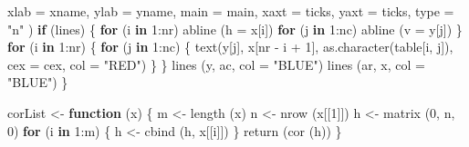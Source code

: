 \documentclass[
  12pt,
]{book}
\newenvironment{Shaded}{\begin{snugshade}}{\end{snugshade}}
\newcommand{\AttributeTok}[1]{\textcolor[rgb]{0.77,0.63,0.00}{#1}}
\newcommand{\ControlFlowTok}[1]{\textcolor[rgb]{0.13,0.29,0.53}{\textbf{#1}}}
\newcommand{\DecValTok}[1]{\textcolor[rgb]{0.00,0.00,0.81}{#1}}
\newcommand{\FunctionTok}[1]{\textcolor[rgb]{0.00,0.00,0.00}{#1}}
\newcommand{\NormalTok}[1]{#1}
\newcommand{\OtherTok}[1]{\textcolor[rgb]{0.56,0.35,0.01}{#1}}
\newcommand{\SpecialCharTok}[1]{\textcolor[rgb]{0.00,0.00,0.00}{#1}}
\newcommand{\StringTok}[1]{\textcolor[rgb]{0.31,0.60,0.02}{#1}}
\begin{document}
\begin{Shaded}
\begin{Highlighting}[]
      \AttributeTok{xlab =}\NormalTok{ xname,}
      \AttributeTok{ylab =}\NormalTok{ yname,}
      \AttributeTok{main =}\NormalTok{ main,}
      \AttributeTok{xaxt =}\NormalTok{ ticks,}
      \AttributeTok{yaxt =}\NormalTok{ ticks,}
      \AttributeTok{type =} \StringTok{"n"}
\NormalTok{    )}
    \ControlFlowTok{if}\NormalTok{ (lines) \{}
      \ControlFlowTok{for}\NormalTok{ (i }\ControlFlowTok{in} \DecValTok{1}\SpecialCharTok{:}\NormalTok{nr)}
        \FunctionTok{abline}\NormalTok{ (}\AttributeTok{h =}\NormalTok{ x[i])}
      \ControlFlowTok{for}\NormalTok{ (j }\ControlFlowTok{in} \DecValTok{1}\SpecialCharTok{:}\NormalTok{nc)}
        \FunctionTok{abline}\NormalTok{ (}\AttributeTok{v =}\NormalTok{ y[j])}
\NormalTok{    \}}
    \ControlFlowTok{for}\NormalTok{ (i }\ControlFlowTok{in} \DecValTok{1}\SpecialCharTok{:}\NormalTok{nr) \{}
      \ControlFlowTok{for}\NormalTok{ (j }\ControlFlowTok{in} \DecValTok{1}\SpecialCharTok{:}\NormalTok{nc) \{}
        \FunctionTok{text}\NormalTok{(y[j],}
\NormalTok{             x[nr }\SpecialCharTok{{-}}\NormalTok{ i }\SpecialCharTok{+} \DecValTok{1}\NormalTok{],}
             \FunctionTok{as.character}\NormalTok{(table[i, j]),}
             \AttributeTok{cex =}\NormalTok{ cex,}
             \AttributeTok{col =} \StringTok{"RED"}\NormalTok{)}
\NormalTok{      \}}
\NormalTok{    \}}
    \FunctionTok{lines}\NormalTok{ (y, ac, }\AttributeTok{col =} \StringTok{"BLUE"}\NormalTok{)}
    \FunctionTok{lines}\NormalTok{ (ar, x, }\AttributeTok{col =} \StringTok{"BLUE"}\NormalTok{)}
\NormalTok{  \}}

\NormalTok{corList }\OtherTok{\textless{}{-}} \ControlFlowTok{function}\NormalTok{ (x) \{}
\NormalTok{  m }\OtherTok{\textless{}{-}} \FunctionTok{length}\NormalTok{ (x)}
\NormalTok{  n }\OtherTok{\textless{}{-}} \FunctionTok{nrow}\NormalTok{ (x[[}\DecValTok{1}\NormalTok{]])}
\NormalTok{  h }\OtherTok{\textless{}{-}} \FunctionTok{matrix}\NormalTok{ (}\DecValTok{0}\NormalTok{, n, }\DecValTok{0}\NormalTok{)}
  \ControlFlowTok{for}\NormalTok{ (i }\ControlFlowTok{in} \DecValTok{1}\SpecialCharTok{:}\NormalTok{m) \{}
\NormalTok{    h }\OtherTok{\textless{}{-}} \FunctionTok{cbind}\NormalTok{ (h, x[[i]])}
\NormalTok{  \}}
  \FunctionTok{return}\NormalTok{ (}\FunctionTok{cor}\NormalTok{ (h))}
\NormalTok{\}}


\end{Highlighting}
\end{Shaded}
\end{document}
